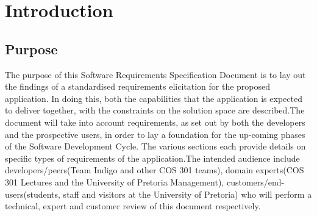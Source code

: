 \documentclass[runningheads,a4paper]{article}
\begin{document}

\begingroup

\tableofcontents
{}
\endgroup
\newpage


\section{Introduction}

\subsection{Purpose}
The purpose of this Software Requirements Specification Document is to lay out the findings of a standardised requirements elicitation for the proposed application. In doing this, both the capabilities that the application is expected to deliver together, with the constraints on the solution space are described.\newline \newline The document will take into account requirements, as set out by both the developers and the prospective users, in order to lay a foundation for the up-coming phases of the Software Development Cycle. The various sections each provide details on specific types of requirements of the application.\newline \newline The intended audience include developers/peers(Team Indigo and other COS 301 teams), domain experts(COS 301 Lectures and the University of Pretoria Management), customers/end-users(students, staff and visitors at the University of Pretoria) who will perform a technical, expert  and customer review of this document respectively.
 
\end{document}
